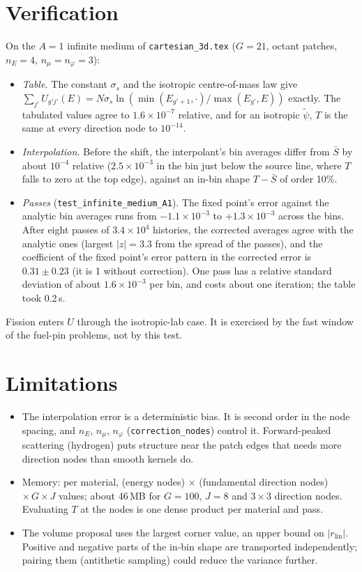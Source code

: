 \documentclass[11pt]{article}
\newcommand{\tpsi}{\tilde\psi}
\newcommand{\Sbar}{\bar S}
\begin{document}
\section{Verification}

On the $A=1$ infinite medium of \texttt{cartesian\_3d.tex} ($G=21$, octant patches,
$n_E=4$, $n_\mu=n_\varphi=3$):
\begin{itemize}
  \item \emph{Table.} The constant $\sigma_s$ and the isotropic centre-of-mass law
  give $\sum_{j'}U_{g'j'}(E) = N\sigma_s\ln(\min(E_{g'+1},\cdot)/\max(E_{g'},E))$
  exactly. The tabulated values agree to $1.6\times10^{-7}$ relative, and for an
  isotropic $\tpsi$, $T$ is the same at every direction node to $10^{-14}$.
  \item \emph{Interpolation.} Before the shift, the interpolant's bin averages
  differ from $\Sbar$ by about $10^{-4}$ relative ($2.5\times10^{-3}$ in the bin just
  below the source line, where $T$ falls to zero at the top edge), against an in-bin
  shape $T-\Sbar$ of order 10\%.
  \item \emph{Passes} (\texttt{test\_infinite\_medium\_A1}). The fixed point's error
  against the analytic bin averages runs from $-1.1\times10^{-3}$ to
  $+1.3\times10^{-3}$ across the bins. After eight passes of $3.4\times10^4$
  histories, the corrected averages agree with the analytic ones (largest $|z|=3.3$
  from the spread of the passes), and the coefficient of the fixed point's error
  pattern in the corrected error is $0.31\pm0.23$ (it is 1 without correction). One
  pass has a relative standard deviation of about $1.6\times10^{-3}$ per bin, and
  costs about one iteration; the table took 0.2\,s.
\end{itemize}
Fission enters $U$ through the isotropic-lab case. It is exercised by the fast
window of the fuel-pin problems, not by this test.

\section{Limitations}

\begin{itemize}
  \item The interpolation error is a deterministic bias. It is second order in the
  node spacing, and $n_E$, $n_\mu$, $n_\varphi$ (\texttt{correction\_nodes}) control
  it. Forward-peaked scattering (hydrogen) puts structure near the patch edges that
  needs more direction nodes than smooth kernels do.
  \item Memory: per material, (energy nodes) $\times$ (fundamental direction nodes)
  $\times\,G\times J$ values; about 46\,MB for $G=100$, $J=8$ and $3\times3$
  direction nodes. Evaluating $T$ at the nodes is one dense product per material and
  pass.
  \item The volume proposal uses the largest corner value, an upper bound on
  $|r_{\text{lin}}|$. Positive and negative parts of the in-bin shape are transported
  independently; pairing them (antithetic sampling) could reduce the variance
  further.
\end{itemize}
\end{document}
